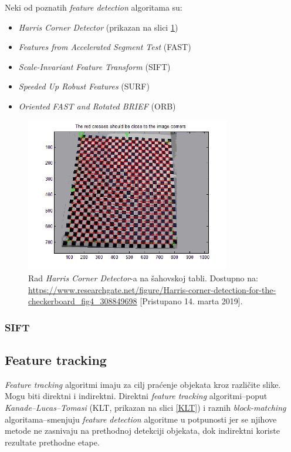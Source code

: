 \documentclass{article}
\begin{document}
        Neki od poznatih \textit{feature detection} algoritama su:
        \begin{itemize}
            \item \textit{Harris Corner Detector} (prikazan na slici \ref{Harris})
            \item \textit{Features from Accelerated Segment Test} (FAST)
            \item \textit{Scale-Invariant Feature Transform} (SIFT)
            \item \textit{Speeded Up Robust Features} (SURF)
            \item \textit{Oriented FAST and Rotated BRIEF} (ORB)
        \end{itemize}
        \begin{figure}[H]
            \centering
            \includegraphics[width=0.8\textwidth]{Harris.png}
            \caption{Rad \textit{Harris Corner Detector}-a na šahovskoj tabli. Dostupno na: \url{https://www.researchgate.net/figure/Harris-corner-detection-for-the-checkerboard_fig4_308849698} [Pristupano 14. marta 2019].}
            \label{Harris}
        \end{figure}
    \subsubsection{SIFT}
    
    
    \subsection{Feature tracking}
        \textit{Feature tracking} algoritmi imaju za cilj praćenje objekata kroz različite slike. Mogu biti direktni i indirektni. Direktni \textit{feature tracking} algoritmi–poput \textit{Kanade–Lucas–Tomasi} (KLT, prikazan na slici \ref{KLT}) i raznih \textit{block-matching} algoritama–smenjuju \textit{feature detection} algoritme u potpunosti jer se njihove metode ne zasnivaju na prethodnoj detekciji objekata, dok indirektni koriste rezultate prethodne etape.
\end{document}
